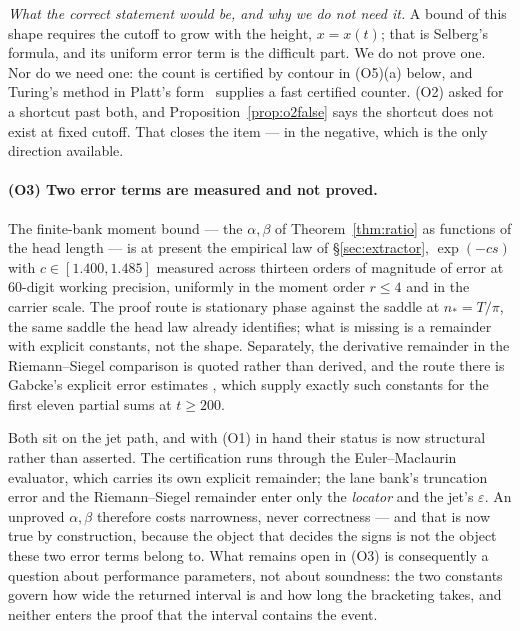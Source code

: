 \documentclass[11pt]{article}
\theoremstyle{plain}
\theoremstyle{definition}
\theoremstyle{remark}
\begin{document}
\emph{What the correct statement would be, and why we do not need it.} A bound of this
shape requires the cutoff to grow with the height, $x=x(t)$; that is Selberg's formula,
and its uniform error term is the difficult part. We do not prove one. Nor do we need
one: the count is certified by contour in (O5)(a) below, and Turing's method in Platt's
form~\cite{Platt2017} supplies a fast certified counter. (O2) asked for a shortcut past
both, and Proposition~\ref{prop:o2false} says the shortcut does not exist at fixed
cutoff. That closes the item --- in the negative, which is the only direction available.

\paragraph{(O3) Two error terms are measured and not proved.}
The finite-bank moment bound --- the $\alpha,\beta$ of Theorem~\ref{thm:ratio} as
functions of the head length --- is at present the empirical law of
\S\ref{sec:extractor}, $\exp(-cs)$ with $c\in[1.400,1.485]$ measured across thirteen
orders of magnitude of error at $60$-digit working precision, uniformly in the moment
order $r\le4$ and in the carrier scale. The proof route is stationary phase against the saddle at
$n_\ast=T/\pi$, the same saddle the head law already identifies; what is missing is a
remainder with explicit constants, not the shape. Separately, the derivative remainder
in the Riemann--Siegel comparison is quoted rather than derived, and the route there is
Gabcke's explicit error estimates \cite{Gabcke1979}, which supply exactly such
constants for the first eleven partial sums at $t\ge200$.

Both sit on the jet path, and with (O1) in hand their status is now structural rather
than asserted. The certification runs through the Euler--Maclaurin evaluator, which
carries its own explicit remainder; the lane bank's truncation error and the
Riemann--Siegel remainder enter only the \emph{locator} and the jet's $\varepsilon$.
An unproved $\alpha,\beta$ therefore costs narrowness, never correctness --- and that
is now true by construction, because the object that decides the signs is not the
object these two error terms belong to. What remains open in (O3) is consequently a
question about performance parameters, not about soundness: the two constants govern
how wide the returned interval is and how long the bracketing takes, and neither
enters the proof that the interval contains the event.
\end{document}
